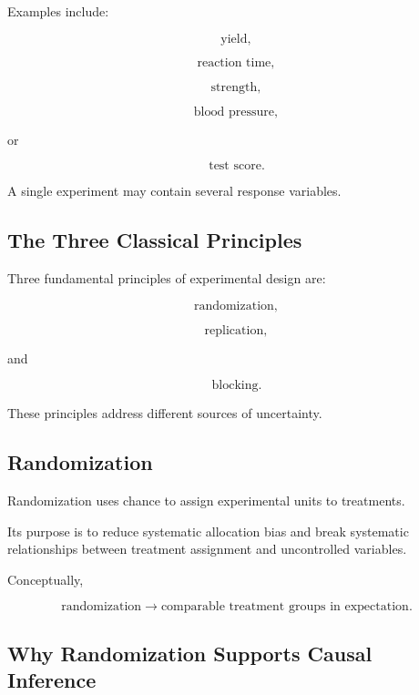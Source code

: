 Examples include:

\[
\boxed{
\text{yield},
}
\]

\[
\boxed{
\text{reaction time},
}
\]

\[
\boxed{
\text{strength},
}
\]

\[
\boxed{
\text{blood pressure},
}
\]

or

\[
\boxed{
\text{test score}.
}
\]

A single experiment may contain several response variables.

\subsection{The Three Classical Principles}
\label{subsec:classical-design-principles}

Three fundamental principles of experimental design are:

\[
\boxed{
\text{randomization},
}
\]

\[
\boxed{
\text{replication},
}
\]

and

\[
\boxed{
\text{blocking}.
}
\]

These principles address different sources of uncertainty.

\subsection{Randomization}
\label{subsec:randomization-design}

Randomization uses chance to assign experimental units to treatments.

Its purpose is to reduce systematic allocation bias and break systematic
relationships between treatment assignment and uncontrolled variables.

Conceptually,

\[
\boxed{
\text{randomization}
\rightarrow
\text{comparable treatment groups in expectation}.
}
\]

\subsection{Why Randomization Supports Causal Inference}
\label{subsec:randomization-causal}

